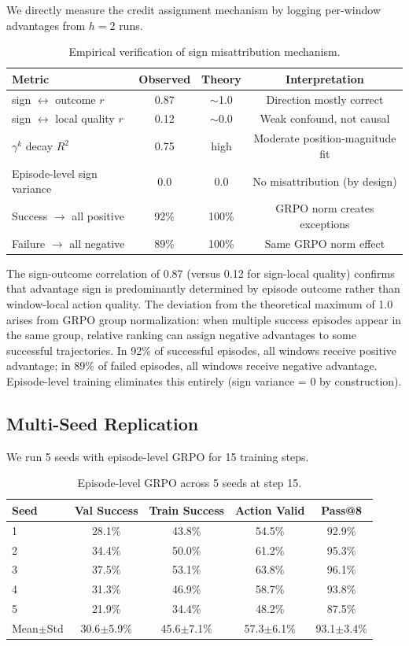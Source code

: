\documentclass[11pt]{article}
\begin{document}
We directly measure the credit assignment mechanism by logging per-window advantages from $h=2$ runs.

\begin{table}[h]
\centering
\caption{Empirical verification of sign misattribution mechanism.}
\label{tab:mechanism}
\begin{tabular}{lccc}
\toprule
Metric & Observed & Theory & Interpretation \\
\midrule
sign $\leftrightarrow$ outcome $r$ & 0.87 & $\sim$1.0 & Direction mostly correct \\
sign $\leftrightarrow$ local quality $r$ & 0.12 & $\sim$0.0 & Weak confound, not causal \\
$\gamma^k$ decay $R^2$ & 0.75 & high & Moderate position-magnitude fit \\
Episode-level sign variance & 0.0 & 0.0 & No misattribution (by design) \\
Success $\rightarrow$ all positive & 92\% & 100\% & GRPO norm creates exceptions \\
Failure $\rightarrow$ all negative & 89\% & 100\% & Same GRPO norm effect \\
\bottomrule
\end{tabular}
\end{table}

The sign-outcome correlation of 0.87 (versus 0.12 for sign-local quality) confirms that advantage sign is predominantly determined by episode outcome rather than window-local action quality. The deviation from the theoretical maximum of 1.0 arises from GRPO group normalization: when multiple success episodes appear in the same group, relative ranking can assign negative advantages to some successful trajectories. In 92\% of successful episodes, all windows receive positive advantage; in 89\% of failed episodes, all windows receive negative advantage. Episode-level training eliminates this entirely (sign variance = 0 by construction).

\subsection{Multi-Seed Replication}

We run 5 seeds with episode-level GRPO for 15 training steps.

\begin{table}[h]
\centering
\caption{Episode-level GRPO across 5 seeds at step 15.}
\label{tab:multiseed}
\begin{tabular}{lcccc}
\toprule
Seed & Val Success & Train Success & Action Valid & Pass@8 \\
\midrule
1 & 28.1\% & 43.8\% & 54.5\% & 92.9\% \\
2 & 34.4\% & 50.0\% & 61.2\% & 95.3\% \\
3 & 37.5\% & 53.1\% & 63.8\% & 96.1\% \\
4 & 31.3\% & 46.9\% & 58.7\% & 93.8\% \\
5 & 21.9\% & 34.4\% & 48.2\% & 87.5\% \\
\midrule
Mean$\pm$Std & 30.6$\pm$5.9\% & 45.6$\pm$7.1\% & 57.3$\pm$6.1\% & 93.1$\pm$3.4\% \\
\bottomrule
\end{tabular}
\end{table}
\end{document}

